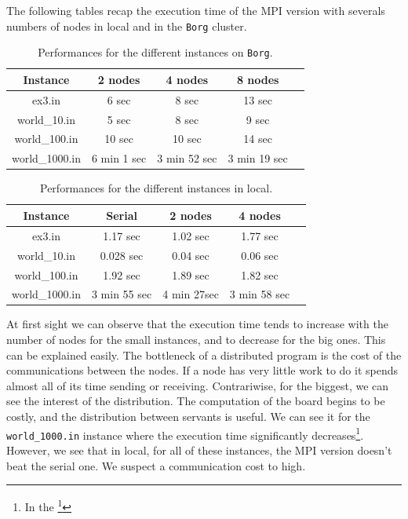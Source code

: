 \documentclass[a4paper,10pt]{article}
\begin{document}
The following tables recap the execution time of the MPI version with severals numbers of nodes in local and in the \texttt{Borg} cluster.
\begin{table}[!ht]
\centering
\begin{tabular}{|c||c|c|c|c|}
  \hline
    Instance     &  2 nodes   & 4 nodes  & 8 nodes  \\
  \hline
    ex3.in       &    6 sec       & 8 sec       &  13 sec \\
  \hline
    world\_10.in &    5 sec      & 8 sec      &  9 sec \\
  \hline
   world\_100.in &    10 sec     & 10 sec     &  14 sec \\
  \hline
  world\_1000.in &     6 min 1 sec   & 3 min 52 sec      & 3 min 19 sec  \\
  \hline
\end{tabular}
\caption{Performances for the different instances on \texttt{Borg}.}
\end{table}

\begin{table}[!ht]
\centering
\begin{tabular}{|c||c|c|c|c|}
  \hline
    Instance     & Serial   & 2 nodes   & 4 nodes   \\
  \hline
    ex3.in       &    1.17 sec   &  1.02 sec  & 1.77 sec  \\ 
  \hline
    world\_10.in &    0.028 sec   &  0.04 sec      & 0.06 sec   \\ 
  \hline
   world\_100.in &    1.92 sec   &   1.89 sec     &  1.82 sec   \\ 
  \hline
  world\_1000.in &    3 min 55 sec  &    4 min 27sec   & 3 min 58 sec   \\ 
  \hline
\end{tabular}
\caption{Performances for the different instances in local.}
\end{table}


At first sight we can observe that the execution time tends to increase with the number of nodes for the small instances, and
to decrease for the big ones. This can be explained easily. The bottleneck of a distributed program is the cost of the communications
between the nodes. If a node has very little work to do it spends almost all of its time sending or receiving.
Contrariwise, for the biggest, we can see the interest of the distribution. The computation of the board begins to be costly, and
the distribution between servants is useful. We can see it for the \texttt{world\_1000.in} instance where the execution time
significantly decreases\footnote{In the \footnote{Cluster}}. However, we see that in local, for all of these instances, the MPI version doesn't beat the serial one.
We suspect a communication cost to high.
\\
\end{document}
